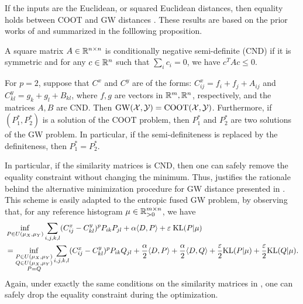 If the inputs are the Euclidean, or squared Euclidean distances, then equality holds between
COOT and GW distances \citep{Sejourne20,Redko20}. These results are based on the prior works
of \citet{Konno76,Maron18} and summarized in the folllowing proposition.
\begin{definition}
  A square matrix $A \in \mathbb R^{n \times n}$ is conditionally negative semi-definite (CND)
  if it is symmetric and for any $c \in \mathbb R^n$ such that $\sum_i c_i = 0$, we have
  $c^T A c \leq 0$.
\end{definition}
\begin{proposition}
  \label{prop:coot_gw_equiv}
  For $p=2$, suppose that $C^x$ and $C^y$ are of the forms:
  $C^x_{ij} = f_i + f_j + A_{ij}$ and $C^y_{kl} = g_k + g_l + B_{kl}$,
  where $f, g$ are vectors in $\mathbb R^m, \mathbb R^n$, respectively,
  and the matrices $A, B$ are CND. Then $\text{GW}(\mathcal X, \mathcal Y) = \text{COOT}(\mathcal X, \mathcal Y)$.
  Furthermore, if $(P_1^*, P_2^*)$ is a solution of the COOT problem, then $P_1^*$ and $P_2^*$
  are two solutions of the GW problem. In particular,
  if the semi-definiteness is replaced by the definiteness, then $P_1^* = P_2^*$.
\end{proposition}
In particular, if the similarity matrices is CND,
then one can safely remove the equality constraint without changing the minimum.
Thus,  justifies the rationale behind
the alternative minimization procedure for GW distance presented in .
This scheme is easily adapted to the entropic fused GW problem, by observing that,
for any reference histogram $\mu \in \mathbb R_{> 0}^{m \times n}$, we have
\begin{equation}
  \begin{split}
    &\inf_{\substack{P \in U(\mu_X, \mu_Y)}}
  \sum_{i,j,k,l} (C^x_{ij} - C^y_{kl})^p P_{ik} P_{jl}
  + \alpha \langle D, P \rangle + \varepsilon \; \text{KL}(P | \mu) \\
  &= \inf_{\substack{P \in U(\mu_X, \mu_Y) \\ Q \in U(\mu_X, \mu_Y) \\ P = Q }}
  \sum_{i,j,k,l} (C^x_{ij} - C^y_{kl})^p P_{ik} Q_{jl}
  + \frac{\alpha}{2} \langle D, P \rangle + \frac{\alpha}{2} \langle D, Q \rangle
  + \frac{\varepsilon}{2} \text{KL}(P | \mu) + \frac{\varepsilon}{2} \text{KL}(Q | \mu).
  \end{split}
\end{equation}
Again, under exactly the same conditions on the similarity matrices in ,
one can safely drop the equality constraint during the optimization.

